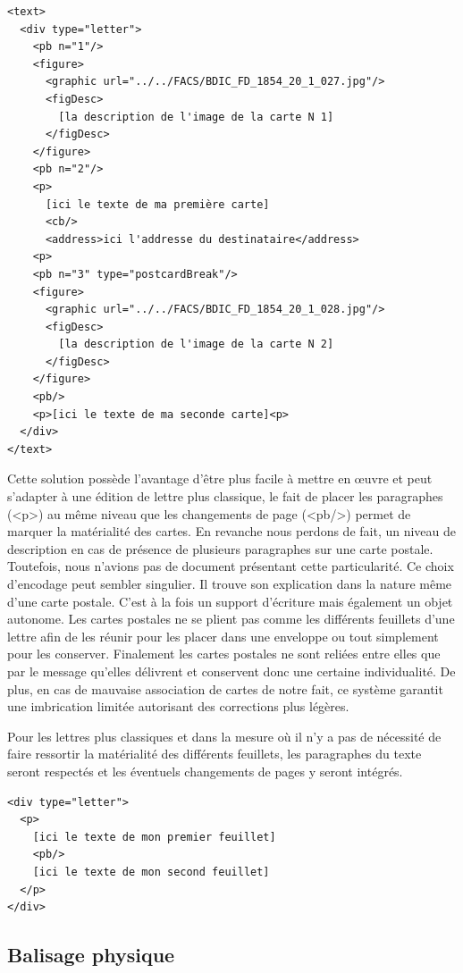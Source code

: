 \documentclass[12pt,a4paper]{book} %
\begin{document}
\begin{lstlisting}
<text>
  <div type="letter">
    <pb n="1"/>
    <figure>
      <graphic url="../../FACS/BDIC_FD_1854_20_1_027.jpg"/>
      <figDesc>
        [la description de l'image de la carte N 1]
      </figDesc>
    </figure>
    <pb n="2"/>
    <p>
      [ici le texte de ma première carte]
      <cb/>
      <address>ici l'addresse du destinataire</address>
    <p>        
    <pb n="3" type="postcardBreak"/>
    <figure>
      <graphic url="../../FACS/BDIC_FD_1854_20_1_028.jpg"/>
      <figDesc>
        [la description de l'image de la carte N 2]
      </figDesc>
    </figure>
    <pb/>
    <p>[ici le texte de ma seconde carte]<p>            
  </div>
</text>
\end{lstlisting}
\bigskip

Cette solution possède l'avantage d'être plus facile à mettre en œuvre et peut s'adapter à une édition de lettre plus classique, le fait de placer les paragraphes (<p>) au même niveau que les changements de page (<pb/>) permet de marquer la matérialité des cartes. En revanche nous perdons de fait, un niveau de description en cas de présence de plusieurs paragraphes sur une carte postale. Toutefois, nous n'avions pas de document présentant cette particularité. 
Ce choix d'encodage peut sembler singulier. Il trouve son explication dans la nature même d'une carte postale. C'est à la fois un support d'écriture mais également un objet autonome. Les cartes postales ne se plient pas comme les différents feuillets d'une lettre afin de les réunir pour les placer dans une enveloppe ou tout simplement pour les conserver. Finalement les cartes postales ne sont reliées entre elles que par le message qu'elles délivrent et conservent donc une certaine individualité. De plus, en cas de mauvaise association de cartes de notre fait, ce système garantit une imbrication limitée autorisant des corrections plus légères.

Pour les lettres plus classiques et dans la mesure où il n'y a pas de nécessité de faire ressortir la matérialité des différents feuillets, les paragraphes du texte seront respectés et les éventuels changements de pages y seront intégrés.
\bigskip

\begin{lstlisting}
<div type="letter">
  <p>
    [ici le texte de mon premier feuillet]
    <pb/>
    [ici le texte de mon second feuillet]
  </p>
</div>
\end{lstlisting}
\bigskip

\subsection{Balisage physique}
\end{document}
